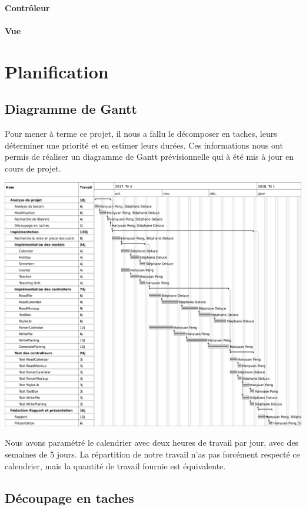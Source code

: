 \documentclass{polytech/polytech}
\begin{document}
	\subsubsection{Contrôleur}

	\subsubsection{Vue}

	\chapter{Planification}

	\section{Diagramme de Gantt}

	Pour mener à terme ce projet, il nous a fallu le décomposer en taches, leurs déterminer une priorité et en estimer leurs durées. Ces informations nous ont permis de réaliser un diagramme de Gantt prévisionnelle qui à été mis à jour en cours de projet.

	\includegraphics[width=\textwidth]{./img/Gantt.png}

	Nous avons paramétré le calendrier avec deux heures de travail par jour, avec des semaines de 5 jours.
	La répartition de notre travail n'as pas forcément respecté ce calendrier, mais la quantité de travail fournie est équivalente.

	\section{Découpage en taches}
\end{document}
